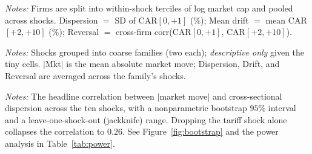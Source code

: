 \documentclass[12pt]{article}
\begin{document}
\begin{table}[htbp]\centering
\begin{threeparttable}
\caption{Size-tercile subsamples: dispersion, drift, and reversal}\label{tab:sizesplit}\small

\begin{tablenotes}\small\item \textit{Notes:} Firms are split into within-shock terciles of log
market cap and pooled across shocks. Dispersion $=$ SD of CAR$[0,+1]$ (\%); Mean drift $=$ mean CAR
$[+2,+10]$ (\%); Reversal $=$ cross-firm corr(CAR$[0,+1]$, CAR$[+2,+10]$).
\end{tablenotes}
\end{threeparttable}
\end{table}

\begin{table}[htbp]\centering
\begin{threeparttable}
\caption{Cross-shock comparison by coarse family (descriptive)}\label{tab:typebucket}\small

\begin{tablenotes}\small\item \textit{Notes:} Shocks grouped into coarse families (two each);
\emph{descriptive only} given the tiny cells. $|$Mkt$|$ is the mean absolute market move; Dispersion,
Drift, and Reversal are averaged across the family's shocks.
\end{tablenotes}
\end{threeparttable}
\end{table}

\begin{table}[htbp]\centering
\begin{threeparttable}
\caption{Fragility of the size--differentiation correlation}\label{tab:boot}\small

\begin{tablenotes}\small\item \textit{Notes:} The headline correlation between $|$market move$|$ and
cross-sectional dispersion across the ten shocks, with a nonparametric bootstrap $95\%$ interval and
a leave-one-shock-out (jackknife) range. Dropping the tariff shock alone collapses the correlation to
$0.26$. See Figure~\ref{fig:bootstrap} and the power analysis in Table~\ref{tab:power}.
\end{tablenotes}
\end{threeparttable}
\end{table}
\end{document}

